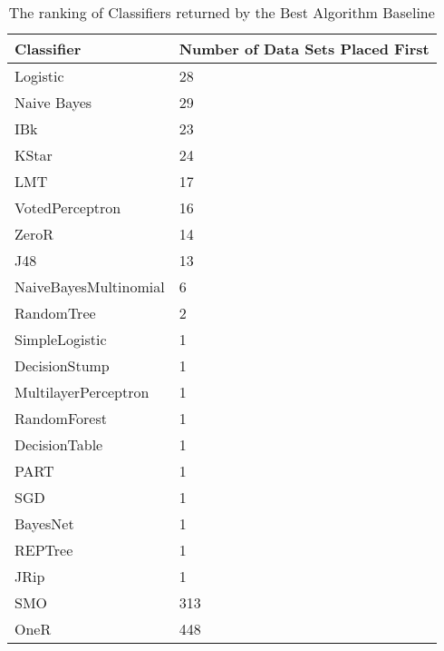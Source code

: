 \begin{table}[h]
\centering
	\begin{tabularx}{\textwidth}{X | X}
		Classifier				&	Number of Data Sets Placed First \\	\hline
		Logistic					&	28								\\	\hline	
		Naive Bayes				&	29								\\	\hline	
		IBk						&	23								\\	\hline	
		KStar					&	24								\\	\hline	
		LMT						&	17								\\	\hline	
		VotedPerceptron			&	16								\\	\hline	
		ZeroR					&	14								\\	\hline	
		J48						&	13								\\	\hline	
		NaiveBayesMultinomial	&	6								\\	\hline	
		RandomTree				&	2								\\	\hline	
		SimpleLogistic			&	1								\\	\hline
		DecisionStump			&	1								\\	\hline
		MultilayerPerceptron		&	1								\\	\hline
		RandomForest				&	1								\\	\hline
		DecisionTable			&	1								\\	\hline
		PART						&	1								\\	\hline
		SGD						&	1								\\	\hline
		BayesNet					&	1								\\	\hline
		REPTree					&	1								\\	\hline
		JRip						&	1								\\	\hline
		SMO						&	313								\\	\hline
		OneR						&	448								\\	\hline																	
	\end{tabularx}
	\label{tab:table1}
	\caption{The ranking of Classifiers returned by the Best Algorithm Baseline}
\end{table}







